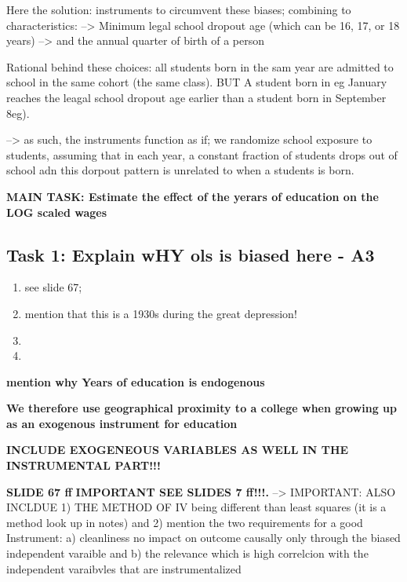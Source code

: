 \documentclass[a4paper]{article}
\begin{document}
Here the solution: instruments to circumvent these biases; combining to characteristics: 
--> Minimum legal school dropout age (which can be 16, 17, or 18 years) 
--> and the annual quarter of birth of a person

Rational behind these choices: all students born in the sam year are admitted to school in the same cohort (the same class). BUT A student born in eg January reaches the leagal school dropout age earlier than a student born in September 8eg).

--> as such, the instruments function as if; we randomize school exposure to students, assuming that in each year, a constant fraction of students drops out of school adn this dorpout pattern is unrelated to when a students is born. 

\textbf{MAIN TASK: Estimate the effect of the yerars of education on the LOG scaled wages}

\subsection{Task 1: Explain wHY ols is biased here - A3}

\begin{enumerate}
   \item see slide 67; 
   \item mention that this is a 1930s during the great depression!
   \item %
   \item %
\end{enumerate}



\textbf{mention why Years of education is endogenous}

\textbf{ We therefore use geographical proximity to a college when growing up as an exogenous instrument for education}

\textbf{INCLUDE EXOGENEOUS VARIABLES AS WELL IN THE  INSTRUMENTAL PART!!!}

\textbf{SLIDE 67 ff}
\textbf{IMPORTANT SEE SLIDES 7 ff!!!.}
--> IMPORTANT: ALSO INCLDUE 1) THE METHOD OF IV being different than least squares (it is a method look up in notes) and 2) mention the two requirements for a good Instrument: a) cleanliness no impact on outcome causally only through the biased independent varaible and b) the relevance which is high correlcion with the independent varaibvles that are instrumentalized
\end{document}
